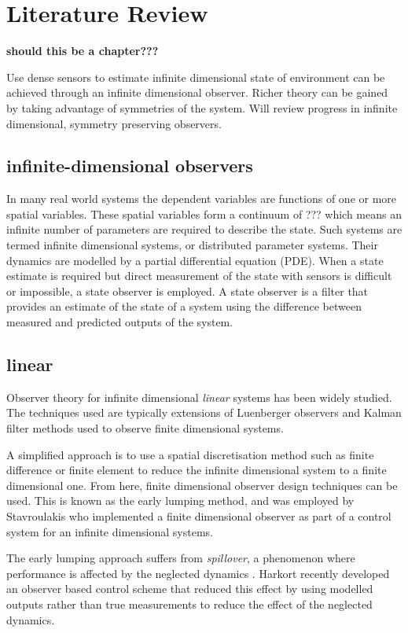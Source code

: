 \section{Literature Review}
\textbf{should this be a chapter???}

Use dense sensors to estimate infinite dimensional state of environment can be achieved through an infinite dimensional observer. Richer theory can be gained by taking advantage of symmetries of the system. Will review progress in infinite dimensional, symmetry preserving observers.

\subsection{infinite-dimensional observers}
In many real world systems the dependent variables are functions of one or more spatial variables. These spatial variables form a continuum of ??? which means an infinite number of parameters are required to describe the state. Such systems are termed infinite dimensional systems, or distributed parameter systems. Their dynamics are modelled by a partial differential equation (PDE). When a state estimate is required but direct measurement of the state with sensors is difficult or impossible, a state observer is employed. A state observer is a filter that provides an estimate of the state of a system using the difference between measured and predicted outputs of the system.

\subsection{linear}
Observer theory for infinite dimensional \textit{linear} systems has been widely studied. The techniques used are typically extensions of Luenberger observers and Kalman filter methods used to observe finite dimensional systems.

A simplified approach is to use a spatial discretisation method such as finite difference or finite element to reduce the infinite dimensional system to a finite dimensional one. From here, finite dimensional observer design techniques can be used. This is known as the early lumping method, and was employed by Stavroulakis \cite{stavroulakis1973design} who implemented a finite dimensional observer as part of a control system for an infinite dimensional systems.

The early lumping approach suffers from \textit{spillover}, a phenomenon where performance is affected by the neglected dynamics \cite{meirovitch1983problem}. Harkort \cite{harkort2011finite} recently developed an observer based control scheme that reduced this effect by using modelled outputs rather than true measurements to reduce the effect of the neglected dynamics.

